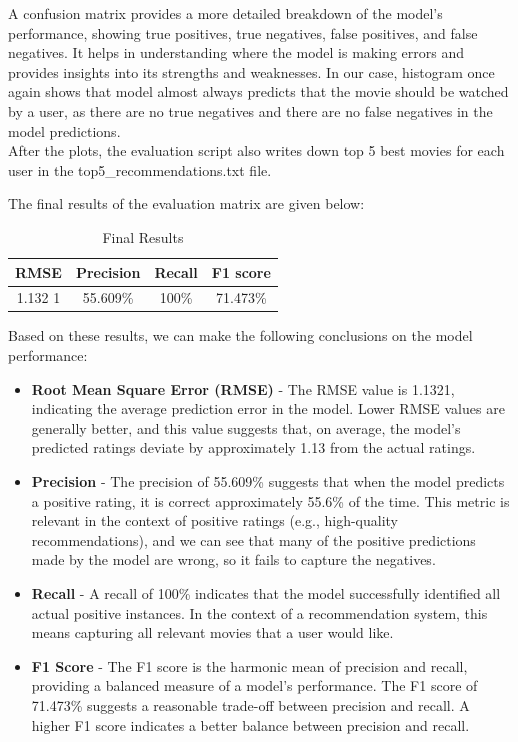 \documentclass[]{article}
\begin{document}
	A confusion matrix provides a more detailed breakdown of the model's performance, showing true positives, true negatives, false positives, and false negatives.
	It helps in understanding where the model is making errors and provides insights into its strengths and weaknesses. In our case, histogram once again shows that model almost always predicts that the movie should be watched by a user, as there are no true negatives and there are no false negatives in the model predictions. \\
	
	After the plots, the evaluation script also writes down top 5 best movies for each user in the top5\_recommendations.txt file.
	
	The final results of the evaluation matrix are given below:
	\begin{table}[ht]
		\centering
		\begin{tabular}{|c|c|c|c|}
			\hline
			\textbf{RMSE} & \textbf{Precision} & \textbf{Recall} & \textbf{F1 score} \\
			\hline
			1.132 1 & 55.609\% & 100\% & 71.473\% \\
			\hline
		\end{tabular}
		\caption{Final Results}
		\label{tab:mytable}
	\end{table}
	
	Based on these results, we can make the following conclusions on the model performance:
	\begin{itemize}
		\item \textbf{Root Mean Square Error (RMSE)} - The RMSE value is 1.1321, indicating the average prediction error in the model. Lower RMSE values are generally better, and this value suggests that, on average, the model's predicted ratings deviate by approximately 1.13 from the actual ratings.
		\item \textbf{Precision} - The precision of 55.609\% suggests that when the model predicts a positive rating, it is correct approximately 55.6\% of the time. This metric is relevant in the context of positive ratings (e.g., high-quality recommendations), and we can see that many of the positive predictions made by the model are wrong, so it fails to capture the negatives.
		\item \textbf{Recall} - A recall of 100\% indicates that the model successfully identified all actual positive instances. In the context of a recommendation system, this means capturing all relevant movies that a user would like.
		\item \textbf{F1 Score} - The F1 score is the harmonic mean of precision and recall, providing a balanced measure of a model's performance. The F1 score of 71.473\% suggests a reasonable trade-off between precision and recall. A higher F1 score indicates a better balance between precision and recall.
	\end{itemize}
	
\end{document}
